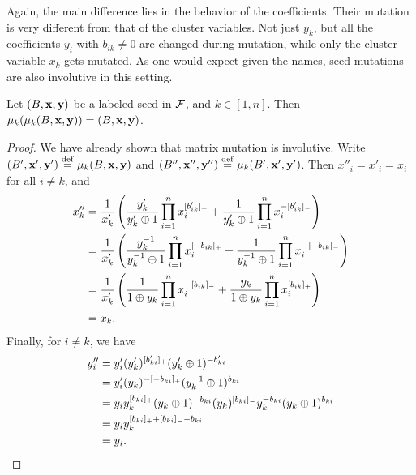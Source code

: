Again, the main difference lies in the behavior of the coefficients. Their mutation is
very different from that of the cluster variables. Not just $y_k$, but all the
coefficients $y_i$ with $b_{ik} \neq 0$ are changed during mutation, while only the
cluster variable $x_k$ gets mutated. As one would expect given the names, seed
mutations are also involutive in this setting.

\begin{proposition}\label{prop:seed_mutation_involutive}

	Let $(B, \mathbf{x}, \mathbf{y})$ be a labeled seed in $\mathcal{F}$, and $k \in [1, n]$. Then
	$\mu_k(\mu_k(B, \mathbf{x}, \mathbf{y})) = (B, \mathbf{x}, \mathbf{y})$.
\end{proposition}
\begin{proof}

	We have already shown that matrix mutation is involutive. Write $(B', \mathbf{x}', \mathbf{y}')
		\overset{\mathrm{def}}{=} \mu_k(B, \mathbf{x}, \mathbf{y})$ and $(B'', \mathbf{x}'', \mathbf{y}'') \overset{\mathrm{def}}{=} \mu_k(B', \mathbf{x}', \mathbf{y}')$. Then
	$x''_i = x'_i = x_i$ for all $i \neq k$, and
	\begin{align*}
		x_k''
		 & = \frac{1}{x_k'}\left(\frac{y'_k}{y'_k \oplus 1} \prod_{i=1}^n x_i^{[b'_{ik}]_{+}} + \frac{1}{y'_k \oplus 1}\prod_{i=1}^n x_i^{-[b'_{ik}]_{-}}\right)          \\
		 & = \frac{1}{x_k'}\left(\frac{y_k^{-1}}{y_k^{-1} \oplus 1} \prod_{i=1}^n x_i^{[-b_{ik}]_{+}} + \frac{1}{y_k^{-1} \oplus 1}\prod_{i=1}^n x_i^{-[-b_{ik}]_{-}}\right) \\
		 & = \frac{1}{x_k'}\left(\frac{1}{1 \oplus y_k} \prod_{i=1}^n x_i^{-[b_{ik}]_{-}} + \frac{y_k}{1 \oplus y_k}\prod_{i=1}^n x_i^{[b_{ik}]_{+}}\right)               \\
		 & = x_k.
	\end{align*}
	Finally, for $i \neq k$, we have
	\begin{align*}
		y''_i
		 & = y_i' (y'_k)^{[b'_{ki}]_{+}}(y'_k \oplus 1)^{-b'_{ki}}                                                   \\
		 & = y_i' (y_k)^{-[-b_{ki}]_{+}}(y_k^{-1} \oplus 1)^{b_{ki}}                                                  \\
		 & = y_i y_k^{[b_{ki}]_{+}}(y_k \oplus 1)^{-b_{ki}} (y_k)^{[b_{ki}]_{-}}y_k^{-b_{ki}}(y_k \oplus 1)^{b_{ki}} \\
		 & = y_i y_k^{[b_{ki}]_{+} + [b_{ki}]_{-} - b_{ki}}                                                          \\
		 & = y_i.
	\end{align*}
\end{proof}

